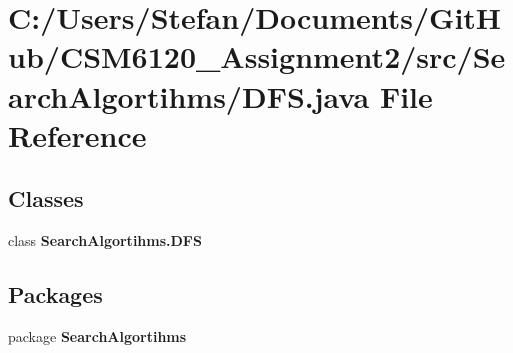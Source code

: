\section{C\+:/\+Users/\+Stefan/\+Documents/\+Git\+Hub/\+C\+S\+M6120\+\_\+\+Assignment2/src/\+Search\+Algortihms/\+D\+F\+S.java File Reference}
\label{_d_f_s_8java}
\subsection*{Classes}
\begin{DoxyCompactItemize}
\item 
class {\bf Search\+Algortihms.\+D\+F\+S}
\end{DoxyCompactItemize}
\subsection*{Packages}
\begin{DoxyCompactItemize}
\item 
package {\bf Search\+Algortihms}
\end{DoxyCompactItemize}
